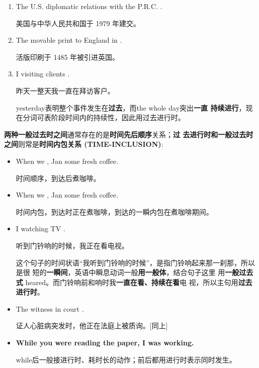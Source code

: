 \begin{enumerate}
\item The U.S.  diplomatic relations with the P.R.C. .

  美国与中华人民共和国于 1979 年建交。

\item  The movable print  to England in .

  活版印刷于 1485 年被引进英国。

\item I  visiting clients  .

  昨天一整天我一直在拜访客户。

  yesterday表明整个事件发生在\textbf{过去}，而the whole day突出\textbf{一直
    持续进行}，现在分词可表阶段时间内的持续性，因此用过去进行时。
\end{enumerate}


\textbf{两种一般过去时之间}通常存在的是\textbf{时间先后顺序}关系；\textbf{过
  去进行时和一般过去时之间}则常是\textbf{时间内包关系 (TIME-INCLUSION)}:
\begin{itemize}
\item When we , Jan  some fresh coffee.

  时间顺序，到达后煮咖啡。

\item When we , Jan  some fresh coffee.

  时间内包，到达时正在煮咖啡，到达的一瞬内包在煮咖啡期间。


\item I  watching TV  .

  听到门钤响的时候，我正在看电视。

  这个句子的时间状语“我听到门铃响的时候”，是指门铃响起来那一刹那，所以是很
  短的\textbf{一瞬间}，英语中瞬息动词一般\textbf{用一般体}，结合句子这里
  用\textbf{一般过去式} heared。而门铃响前和响时我\textbf{一直在看、持续在看}电
  视，所以主句用\textbf{过去进行时}。


\item  The witness  in court  .

  证人心脏病突发时，他正在法庭上被质询。[同上]
\item \textbf{While you were reading the paper, I was working.}

  while后一般接进行时、耗时长的动作；前后都用进行时表示同时发生。
\end{itemize}

